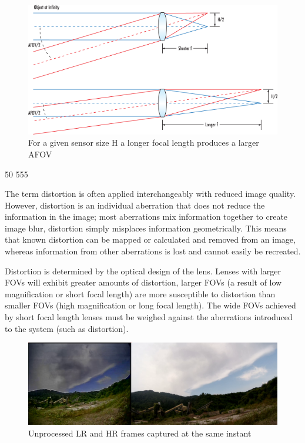 \begin{figure}[h]
  \centering
  \includegraphics[scale=0.5]{figures/AFOV.png}
  \caption{For a given sensor size H a longer focal length produces a larger AFOV}
\end{figure}50 555

The term distortion is often applied interchangeably with reduced image quality. However, distortion is an individual aberration that does not reduce the information in the image; most aberrations mix information together to create image blur, distortion simply misplaces information geometrically. This means that known distortion can be mapped or calculated and removed from an image, whereas information from other aberrations is lost and cannot easily be recreated.

Distortion is determined by the optical design of the lens. Lenses with larger FOVs will exhibit greater amounts of distortion, larger FOVs (a result of low magnification or short focal length) are more susceptible to distortion than smaller FOVs (high magnification or long focal length). The wide FOVs achieved by short focal length lenses must be weighed against the aberrations introduced to the system (such as distortion)\cite{distortion}.

\begin{figure}[h]
  \centering
  \includegraphics[scale=0.25]{figures/OG_sbs.png}
  \caption{Unprocessed LR and HR frames captured at the same instant}
  \label{img:og_sbs}
\end{figure}

